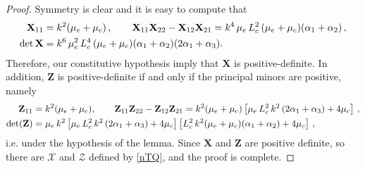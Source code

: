 \documentclass[10pt,a4paper]{amsart}
\begin{document}
 \begin{proof}
 	Symmetry is clear and it is easy to compute that	\begin{align}
 	{\mathbf{X}}_{11}&= k^2(\mu_{\rm e} +\mu_{\rm c}) \,,\qquad 
 	{\mathbf{X}}_{11}{\mathbf{X}}_{22}-{\mathbf{X}}_{12}{\mathbf{X}}_{21}=k^4\,\mu_{\rm e}\,L_{\rm c}^2\,( \mu_{\rm e} +\mu_{\rm c} )(\alpha_1+\alpha_2)\,,\\ 
 	\det {{\mathbf{X}}}&=k^6\,\mu_{\rm e}^2\,L_{\rm c}^4\,( \mu_{\rm e} +\mu_{\rm c} )(\alpha_1+\alpha_2)(2\alpha_1+\alpha_3).\notag
 	\end{align}
 	Therefore, our constitutive  hypothesis imply that ${\mathbf{X}}$ is positive-definite. In addition,  ${\mathbf{Z}}$ is positive-definite if and only if the principal minors are positive, namely
 	\begin{align}
 	{\mathbf{Z}}_{11}&=k^2(\mu_{\rm e} +\mu_{\rm c}),\qquad
 	{\mathbf{Z}}_{11}{\mathbf{Z}}_{22}-{\mathbf{Z}}_{12}{\mathbf{Z}}_{21}=k^2(\mu_{\rm e} +\mu_{\rm c})\left[{\mu_{\rm e}\,L_{\rm c}^2}\,k^2\,(2\alpha_1+\alpha_3)+4 \mu_{\rm c}\right]\,,\\
 	\det({\mathbf{Z}})&=\mu_{\rm e}\,k^2\left[\mu_{\rm e}\,L_{\rm c}^2\,k^2\,(2\alpha_1+\alpha_3)+4 \mu_{\rm c}\right]\left[L_{\rm c}^2\,k^2(\mu_{\rm e} +\mu_{\rm c})(\alpha_1+\alpha_2)+4 \mu_{\rm c}\right]\,,\notag
 	\end{align}
 i.e. under the hypothesis of the lemma. 
 Since $\mathbf{X}$ and $\mathbf{Z}$ are positive definite, so there are $\boldsymbol{\mathcal{X}}$ and $\boldsymbol{\mathcal{Z}}$ defined by \eqref{nTQ}, and the proof is complete.
 \end{proof}
\end{document}
